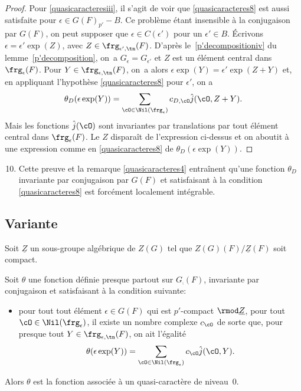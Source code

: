 \begin{proof}
Pour \eqref{quasicaracteresiii}, il s'agit de voir que \eqref{quasicaracteres8} est aussi satisfaite pour $\epsilon\in G(F)_{p'}-B$. Ce problème étant insensible à la conjugaison par $G(F)$, on peut supposer que $\epsilon\in C(\epsilon')$ pour un $\epsilon'\in B$. Écrivons $\epsilon=\epsilon'\exp(Z)$, avec $Z\in \frg_{\epsilon',\tn}(F)$. D'après le~\eqref{p'decompositioniv} du lemme~\ref{p'decomposition}, on~a $G_{\epsilon}=G_{\epsilon'}$ et $Z$ est un élément central dans $\frg_{\epsilon}(F)$. Pour $Y\in \frg_{\epsilon,\tn}(F)$, on~a alors $\epsilon \exp(Y)=\epsilon' \exp(Z+Y)$ et, en appliquant l'hypothèse \eqref{quasicaracteres8} pour $\epsilon'$, on a
\[
\theta_{D}(\epsilon \exp(Y))=\sum_{\cO\in \Nil(\frg_{\epsilon})}c_{D,\cO}\hat{j}(\cO,Z+Y).
\]
Mais les fonctions $\hat{j}(\cO)$ sont invariantes par translations par tout élément central dans $\frg_{\epsilon}(F)$. Le $Z$ disparaît de l'expression ci-dessus et on aboutit à une expression comme en \eqref{quasicaracteres8} de $\theta_{D}(\epsilon \exp(Y))$.
\end{proof}

\skpt
\begin{rem*}
\begin{enumerate}\setcounter{enumi}{9}
\item
Cette preuve et la remarque \eqref{quasicaracteres4} entraînent qu'une fonction $\theta_{D}$ invariante par conjugaison par $G(F)$ et satisfaisant à la condition \eqref{quasicaracteres8} est forcément localement intégrable.
\end{enumerate}
\end{rem*}

\subsection{Variante}\label{variante1}
Soit $\underline{Z}$ un sous-groupe algébrique de $Z(G)$ tel que $Z(G)(F)/ \underline{Z}(F)$ soit compact.

\begin{lem*}
Soit $\theta$ une fonction définie presque partout sur $G_{\comp}(F)$, invariante par conjugaison et satisfaisant à la condition suivante:
\begin{itemize}
\item
pour tout tout élément $\epsilon\in G(F)$ qui est $p'$-compact $\rmod\underline{Z}$, pour tout $\cO\in \Nil(\frg_{\epsilon})$, il existe un nombre complexe $c_{\cO}$ de sorte que, pour presque tout $Y\in \frg_{\epsilon,\tn}(F)$, on ait l'égalité
\[
\theta(\epsilon \exp(Y))=\sum_{\cO\in \Nil(\frg_{\epsilon})}c_{\cO}\hat{j}(\cO,Y).
\]

\end{itemize}
Alors $\theta$ est la fonction associée à un quasi-caractère de niveau~$0$.
\end{lem*}

